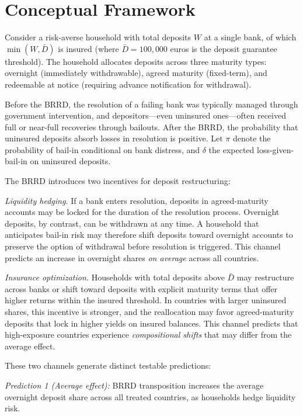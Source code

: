 \documentclass[12pt]{article}
\begin{document}
\section{Conceptual Framework}

Consider a risk-averse household with total deposits $W$ at a single bank, of which $\min(W, \bar{D})$ is insured (where $\bar{D} = 100{,}000$ euros is the deposit guarantee threshold). The household allocates deposits across three maturity types: overnight (immediately withdrawable), agreed maturity (fixed-term), and redeemable at notice (requiring advance notification for withdrawal).

Before the BRRD, the resolution of a failing bank was typically managed through government intervention, and depositors---even uninsured ones---often received full or near-full recoveries through bailouts. After the BRRD, the probability that uninsured deposits absorb losses in resolution is positive. Let $\pi$ denote the probability of bail-in conditional on bank distress, and $\delta$ the expected loss-given-bail-in on uninsured deposits.

The BRRD introduces two incentives for deposit restructuring:

\textit{Liquidity hedging.} If a bank enters resolution, deposits in agreed-maturity accounts may be locked for the duration of the resolution process. Overnight deposits, by contrast, can be withdrawn at any time. A household that anticipates bail-in risk may therefore shift deposits toward overnight accounts to preserve the option of withdrawal before resolution is triggered. This channel predicts an increase in overnight shares \textit{on average} across all countries.

\textit{Insurance optimization.} Households with total deposits above $\bar{D}$ may restructure across banks or shift toward deposits with explicit maturity terms that offer higher returns within the insured threshold. In countries with larger uninsured shares, this incentive is stronger, and the reallocation may favor agreed-maturity deposits that lock in higher yields on insured balances. This channel predicts that high-exposure countries experience \textit{compositional shifts} that may differ from the average effect.

These two channels generate distinct testable predictions:

\textit{Prediction 1 (Average effect):} BRRD transposition increases the average overnight deposit share across all treated countries, as households hedge liquidity risk.
\end{document}
